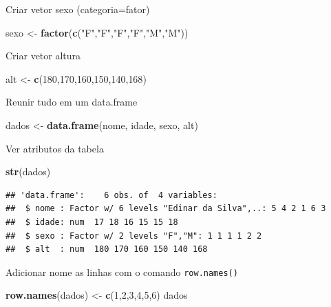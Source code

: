\documentclass[
]{book}
\newenvironment{Shaded}{\begin{snugshade}}{\end{snugshade}}
\newcommand{\DecValTok}[1]{\textcolor[rgb]{0.00,0.00,0.81}{#1}}
\newcommand{\KeywordTok}[1]{\textcolor[rgb]{0.13,0.29,0.53}{\textbf{#1}}}
\newcommand{\NormalTok}[1]{#1}
\newcommand{\StringTok}[1]{\textcolor[rgb]{0.31,0.60,0.02}{#1}}
\begin{document}
Criar vetor sexo (categoria=fator)

\begin{Shaded}
\begin{Highlighting}[]
\NormalTok{sexo <-}\StringTok{ }\KeywordTok{factor}\NormalTok{(}\KeywordTok{c}\NormalTok{(}\StringTok{"F"}\NormalTok{,}\StringTok{"F"}\NormalTok{,}\StringTok{"F"}\NormalTok{,}\StringTok{"F"}\NormalTok{,}\StringTok{"M"}\NormalTok{,}\StringTok{"M"}\NormalTok{))}
\end{Highlighting}
\end{Shaded}

Criar vetor altura

\begin{Shaded}
\begin{Highlighting}[]
\NormalTok{alt <-}\StringTok{ }\KeywordTok{c}\NormalTok{(}\DecValTok{180}\NormalTok{,}\DecValTok{170}\NormalTok{,}\DecValTok{160}\NormalTok{,}\DecValTok{150}\NormalTok{,}\DecValTok{140}\NormalTok{,}\DecValTok{168}\NormalTok{)}
\end{Highlighting}
\end{Shaded}

Reunir tudo em um data.frame

\begin{Shaded}
\begin{Highlighting}[]
\NormalTok{dados <-}\StringTok{ }\KeywordTok{data.frame}\NormalTok{(nome, idade, sexo, alt)}
\end{Highlighting}
\end{Shaded}

Ver atributos da tabela

\begin{Shaded}
\begin{Highlighting}[]
\KeywordTok{str}\NormalTok{(dados)}
\end{Highlighting}
\end{Shaded}

\begin{verbatim}
## 'data.frame':    6 obs. of  4 variables:
##  $ nome : Factor w/ 6 levels "Edinar da Silva",..: 5 4 2 1 6 3
##  $ idade: num  17 18 16 15 15 18
##  $ sexo : Factor w/ 2 levels "F","M": 1 1 1 1 2 2
##  $ alt  : num  180 170 160 150 140 168
\end{verbatim}

Adicionar nome as linhas com o comando \texttt{row.names()}

\begin{Shaded}
\begin{Highlighting}[]
\KeywordTok{row.names}\NormalTok{(dados) <-}\StringTok{ }\KeywordTok{c}\NormalTok{(}\DecValTok{1}\NormalTok{,}\DecValTok{2}\NormalTok{,}\DecValTok{3}\NormalTok{,}\DecValTok{4}\NormalTok{,}\DecValTok{5}\NormalTok{,}\DecValTok{6}\NormalTok{)}
\NormalTok{dados}
\end{Highlighting}
\end{Shaded}
\end{document}

